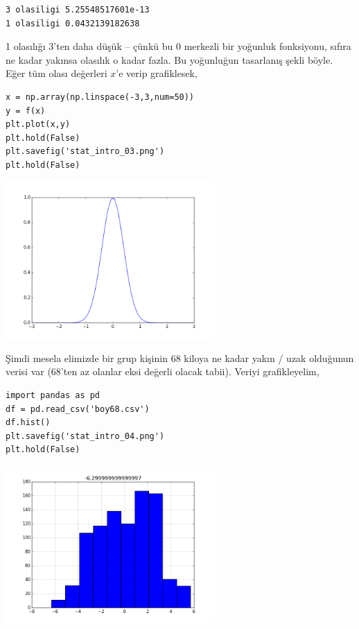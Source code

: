 \documentclass[12pt,fleqn]{article}\usepackage{../../common}
\begin{document}
\begin{verbatim}
3 olasiligi 5.25548517601e-13
1 olasiligi 0.0432139182638
\end{verbatim}

1 olasılığı 3'ten daha düşük -- çünkü bu 0 merkezli bir yoğunluk
fonksiyonu, sıfıra ne kadar yakınsa olasılık o kadar fazla. Bu yoğunluğun
tasarlanış şekli böyle. Eğer tüm olası değerleri $x$'e verip grafiklesek,

\begin{verbatim}
x = np.array(np.linspace(-3,3,num=50))
y = f(x)
plt.plot(x,y)
plt.hold(False)
plt.savefig('stat_intro_03.png')
plt.hold(False)
\end{verbatim}

\includegraphics[height=6cm]{stat_intro_03.png}

Şimdi mesela elimizde bir grup kişinin 68 kiloya ne kadar yakın / uzak
olduğunun verisi var (68'ten az olanlar eksi değerli olacak tabii). Veriyi
grafikleyelim,

\begin{verbatim}
import pandas as pd
df = pd.read_csv('boy68.csv')
df.hist()
plt.savefig('stat_intro_04.png')
plt.hold(False)
\end{verbatim}

\includegraphics[height=6cm]{stat_intro_04.png}
\end{document}
